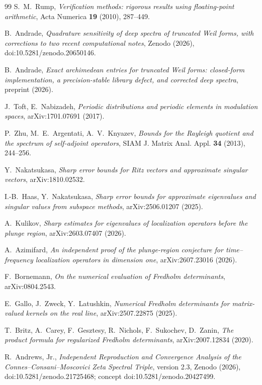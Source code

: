 \documentclass[11pt,a4paper]{article}
\begin{document}
\begin{thebibliography}{99}
S.~M.~Rump,
\emph{Verification methods: rigorous results using floating-point arithmetic},
Acta Numerica \textbf{19} (2010), 287--449.

B.~Andrade,
\emph{Quadrature sensitivity of deep spectra of truncated Weil forms, with
corrections to two recent computational notes}, Zenodo (2026),
doi:10.5281/zenodo.20650146.

B.~Andrade,
\emph{Exact archimedean entries for truncated Weil forms: closed-form
implementation, a precision-stable library defect, and corrected deep spectra},
preprint (2026).

J.~Toft, E.~Nabizadeh,
\emph{Periodic distributions and periodic elements in modulation spaces},
arXiv:1701.07691 (2017).

P.~Zhu, M.~E.~Argentati, A.~V.~Knyazev,
\emph{Bounds for the Rayleigh quotient and the spectrum of self-adjoint
operators}, SIAM J. Matrix Anal. Appl. \textbf{34} (2013), 244--256.

Y.~Nakatsukasa,
\emph{Sharp error bounds for Ritz vectors and approximate singular vectors},
arXiv:1810.02532.

I.-B.~Haas, Y.~Nakatsukasa,
\emph{Sharp error bounds for approximate eigenvalues and singular values from
subspace methods}, arXiv:2506.01207 (2025).

A.~Kulikov,
\emph{Sharp estimates for eigenvalues of localization operators before the
plunge region}, arXiv:2603.07407 (2026).

A.~Azimifard,
\emph{An independent proof of the plunge-region conjecture for time--frequency
localization operators in dimension one}, arXiv:2607.23016 (2026).

F.~Bornemann,
\emph{On the numerical evaluation of Fredholm determinants},
arXiv:0804.2543.

E.~Gallo, J.~Zweck, Y.~Latushkin,
\emph{Numerical Fredholm determinants for matrix-valued kernels on the real
line}, arXiv:2507.22875 (2025).

T.~Britz, A.~Carey, F.~Gesztesy, R.~Nichols, F.~Sukochev, D.~Zanin,
\emph{The product formula for regularized Fredholm determinants},
arXiv:2007.12834 (2020).

R.~Andrews, Jr.,
\emph{Independent Reproduction and Convergence Analysis of the
Connes--Consani--Moscovici Zeta Spectral Triple}, version 2.3, Zenodo (2026),
doi:10.5281/zenodo.21725468; concept doi:10.5281/zenodo.20427499.


\end{thebibliography}
\end{document}
